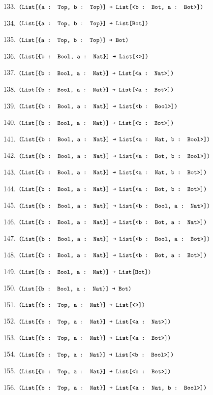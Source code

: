 \documentclass[dvipsnames]{article}
\let\codeOrig\code
\renewcommand{\code}[2][]{%
  \ifmmode
    \if\relax\detokenize{#1}\relax
      \mathchoice{\mbox{\normalfont\small\ttfamily #2}}{\mbox{\normalfont\small\ttfamily #2}}{\mbox{\normalfont\small\ttfamily #2}}{\mbox{\normalfont\small\ttfamily #2}}%
    \else
      \mathchoice{\mbox{\normalfont\small\ttfamily #2}}{\mbox{\normalfont\small\ttfamily #2}}{\mbox{\normalfont\small\ttfamily #2}}{\mbox{\normalfont\small\ttfamily #2}}%
    \fi
  \else
    \codeOrig[#1]{#2}%
  \fi}
\begin{document}
\begin{enumerate}
      133. $\code{(List[\{a : Top, b : Top\}] → List[<b : Bot, a : Bot>])}$

      134. $\code{(List[\{a : Top, b : Top\}] → List[Bot])}$

      135. $\code{(List[\{a : Top, b : Top\}] → Bot)}$

      136. $\code{(List[\{b : Bool, a : Nat\}] → List[<>])}$

      137. $\code{(List[\{b : Bool, a : Nat\}] → List[<a : Nat>])}$

      138. $\code{(List[\{b : Bool, a : Nat\}] → List[<a : Bot>])}$

      139. $\code{(List[\{b : Bool, a : Nat\}] → List[<b : Bool>])}$

      140. $\code{(List[\{b : Bool, a : Nat\}] → List[<b : Bot>])}$

      141. $\code{(List[\{b : Bool, a : Nat\}] → List[<a : Nat, b : Bool>])}$

      142. $\code{(List[\{b : Bool, a : Nat\}] → List[<a : Bot, b : Bool>])}$

      143. $\code{(List[\{b : Bool, a : Nat\}] → List[<a : Nat, b : Bot>])}$

      144. $\code{(List[\{b : Bool, a : Nat\}] → List[<a : Bot, b : Bot>])}$

      145. $\code{(List[\{b : Bool, a : Nat\}] → List[<b : Bool, a : Nat>])}$

      146. $\code{(List[\{b : Bool, a : Nat\}] → List[<b : Bot, a : Nat>])}$

      147. $\code{(List[\{b : Bool, a : Nat\}] → List[<b : Bool, a : Bot>])}$

      148. $\code{(List[\{b : Bool, a : Nat\}] → List[<b : Bot, a : Bot>])}$

      149. $\code{(List[\{b : Bool, a : Nat\}] → List[Bot])}$

      150. $\code{(List[\{b : Bool, a : Nat\}] → Bot)}$

      151. $\code{(List[\{b : Top, a : Nat\}] → List[<>])}$

      152. $\code{(List[\{b : Top, a : Nat\}] → List[<a : Nat>])}$

      153. $\code{(List[\{b : Top, a : Nat\}] → List[<a : Bot>])}$

      154. $\code{(List[\{b : Top, a : Nat\}] → List[<b : Bool>])}$

      155. $\code{(List[\{b : Top, a : Nat\}] → List[<b : Bot>])}$

      156. $\code{(List[\{b : Top, a : Nat\}] → List[<a : Nat, b : Bool>])}$


\end{enumerate}
\end{document}
